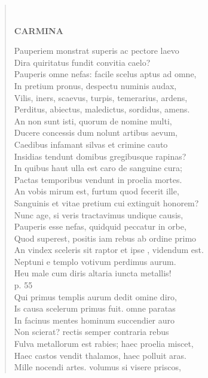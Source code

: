 \documentclass[11pt, a4paper]{report}
\begin{document}
\begin{verse}
        ﻿\pagebreak 
     \marginpar{[92]} \begin{center} \textbf{CARMINA} \end{center}Pauperiem monstrat superis ac pectore laevo \\ Dira quiritatus fundit convitia caelo? \\ Pauperis omne nefas: facile scelus aptus ad omne, \\ In pretium pronus, despectu numinis audax, \\ Vilis, iners, scaevus, turpis, temerarius, ardens, \\ Perditus, abiectus, maledictus, sordidus, amens. \\ An non sunt isti, quorum de nomine multi, \\ Ducere concessis dum nolunt artibus aevum, \\ Caedibus infamant silvas et crimine cauto \\ Insidias tendunt domibus gregibusque rapinas? \\ In quibus haut ulla est caro de sanguine cura; \\ Pactas temporibus vendunt in proelia mortes. \\ An vobis mirum est, furtum quod fecerit ille, \\ Sanguinis et vitae pretium cui extinguit honorem? \\ Nunc age, si veris tractavimus undique causis, \\ Pauperis esse nefas, quidquid peccatur in orbe, \\ Quod superest, positis iam rebus ab ordine primo \\ An vindex sceleris sit raptor  \lbrack et ipse \rbrack , videndum est. \\ Neptuni e templo votivum perdimus aurum. \\ Heu male cum diris altaria iuncta metallis! \\ p. 55 \\ Qui primus templis aurum dedit omine diro, \\ Is causa scelerum primus fuit. omne paratas \\ In facinus mentes hominum succendier auro \\ Non scierat? rectis semper contraria rebus \\ Fulva metallorum est rabies; haec proelia miscet, \\ Haec castos vendit thalamos, haec polluit aras. \\ Mille nocendi artes. volumus si visere priscos, \\ 

\end{verse}
\end{document}

